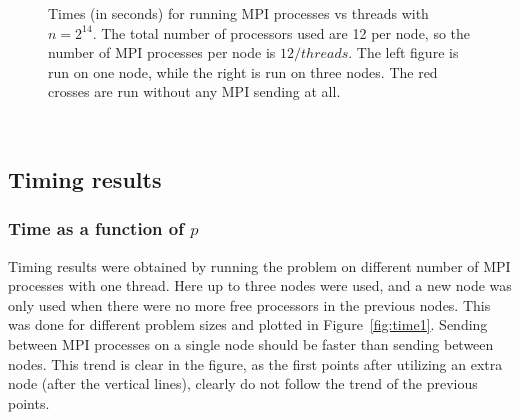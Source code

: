 \begin{figure}[h!]
\begin{subfigure}[b]{0.48\textwidth}
  \end{subfigure}
  \vspace{-0.1\baselineskip}
  \caption{Times (in seconds) for running MPI processes vs threads with $n = 2^{14}$. The total number of processors used are 12 per node, so the number of MPI processes per node is $12 / threads$. The left figure is run on one node, while the right is run on three nodes. The red crosses are run without any MPI sending at all.}
  \label{fig:taskc}
\end{figure}
\\
\subsection{Timing results}
\subsubsection{Time as a function of $p$}
Timing results were obtained by running the problem on different number of MPI processes with one thread. Here up to three nodes were used, and a new node was only used when there were no more free processors in the previous nodes. This was done for different problem sizes and plotted in Figure~\ref{fig:time1}. Sending between MPI processes on a single node should be faster than sending between nodes. This trend is clear in the figure, as the first points after utilizing an extra node (after the vertical lines), clearly do not follow the trend of the previous points. 

